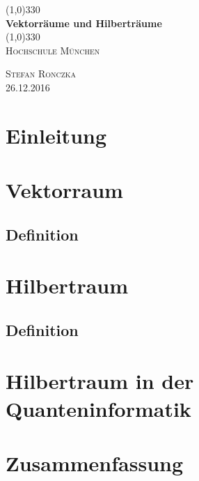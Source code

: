 \documentclass{article}
\begin{document}
\begin{titlepage}
	\begin{center}
	\line(1,0){330} \\
	\vspace{.75 cm}
	\huge{\bfseries Vektorräume und Hilberträume}\\
	\vspace{.25 cm}
	\line(1,0){330} \\
	\vspace{1.5 cm}
	\textsc{\LARGE Hochschule M\"unchen}\\
	\vspace{10 cm}
	\end{center}
	\begin{flushright}
	\textsc{\large Stefan Ronczka\\26.12.2016}
	\end{flushright}
\end{titlepage}

\tableofcontents
\thispagestyle{empty}
\cleardoublepage

\setcounter{page}{1}
\section{Einleitung}\label{sec:intro}
\lipsum[1]
\section{Vektorraum}\label{sec:vec}
\subsection{Definition}\label{sec:vecdef} \cite{ref:one}
\section{Hilbertraum}\label{sec:hil}
\subsection{Definition}\label{sec:hildef}
\section{Hilbertraum in der Quanteninformatik}\label{sec:def}
\section{Zusammenfassung}\label{sec:intro}

\cleardoublepage


\end{document}
